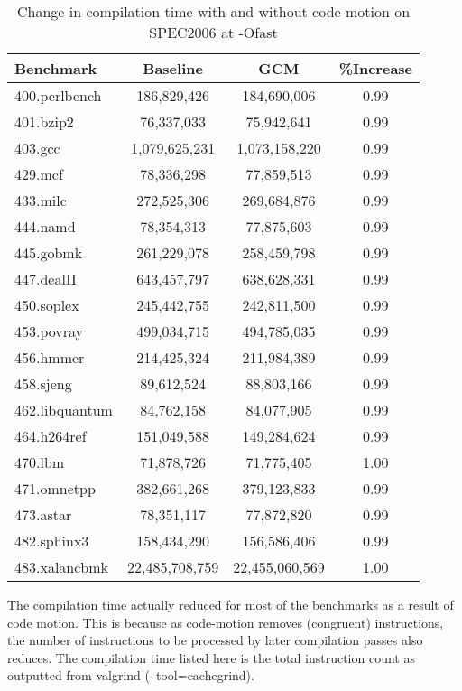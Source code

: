 \documentclass[acmlarge,review,anonymous]{acmart}\settopmatter{printfolios=true}
\begin{document}
\begin{table}[h]
  \begin{center}
    \begin{tabular}{|l|c|c|c|}
      \hline
  Benchmark       &   Baseline	        &  GCM & \%Increase     \\\hline
  400.perlbench	  &   186,829,426	& 184,690,006	& 0.99 \\\hline
  401.bzip2	  &   76,337,033	& 75,942,641	& 0.99 \\\hline
  403.gcc         &   1,079,625,231	& 1,073,158,220	& 0.99 \\\hline
  429.mcf         &   78,336,298	& 77,859,513	& 0.99 \\\hline
  433.milc	  &   272,525,306	& 269,684,876	& 0.99 \\\hline
  444.namd	  &   78,354,313	& 77,875,603	& 0.99 \\\hline
  445.gobmk	  &   261,229,078	& 258,459,798	& 0.99 \\\hline
  447.dealII	  &   643,457,797	& 638,628,331	& 0.99 \\\hline
  450.soplex	  &   245,442,755	& 242,811,500	& 0.99 \\\hline
  453.povray	  &   499,034,715	& 494,785,035	& 0.99 \\\hline
  456.hmmer	  &   214,425,324	& 211,984,389	& 0.99 \\\hline
  458.sjeng	  &   89,612,524	& 88,803,166	& 0.99 \\\hline
  462.libquantum  &   84,762,158	& 84,077,905	& 0.99 \\\hline
  464.h264ref	  &   151,049,588	& 149,284,624	& 0.99 \\\hline
  470.lbm         &   71,878,726	& 71,775,405	& 1.00 \\\hline
  471.omnetpp	  &   382,661,268	& 379,123,833	& 0.99 \\\hline
  473.astar	  &   78,351,117	& 77,872,820	& 0.99 \\\hline
  482.sphinx3	  &   158,434,290	& 156,586,406	& 0.99 \\\hline
  483.xalancbmk	  &   22,485,708,759	& 22,455,060,569& 1.00 \\\hline
    \end{tabular}
  \end{center}
  \caption{Change in compilation time with and without code-motion on SPEC2006 at -Ofast}
  \label{tab:compile-time}
\end{table}

The compilation time actually reduced for most of the benchmarks as a result of code motion.
This is because as code-motion removes (congruent) instructions, the number of instructions
to be processed by later compilation passes also reduces. The compilation time listed here
is the total instruction count as outputted from valgrind (--tool=cachegrind).
\end{document}
